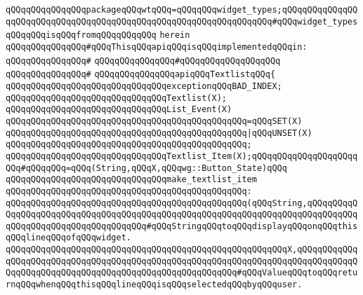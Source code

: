 \verb|qQQqqQQqqQQqqQQqpackageqQQqwtqQQq=qQQqqQQqwidget_types;qQQqqQQqqQQqqQQqqQQqqQQqqQQqqQQqqQQqqQQqqQQqqQQqqQQqqQQqqQQqqQQqqQQq#qQQqwidget_typesqQQqqQQqisqQQqfromqQQqqQQqqQQq|\newline
\verb|herein|\newline
\newline
\verb|qQQqqQQqqQQqqQQq#qQQqThisqQQqapiqQQqisqQQqimplementedqQQqin:|\newline
\verb|qQQqqQQqqQQqqQQq#|\newline
\verb|qQQqqQQqqQQqqQQq#qQQqqQQqqQQqqQQqqQQq|\newline
\verb|qQQqqQQqqQQqqQQq#|\newline
\verb|qQQqqQQqqQQqqQQqapiqQQqTextlistqQQq{|\newline
\newline
\verb|qQQqqQQqqQQqqQQqqQQqqQQqqQQqqQQqexceptionqQQqBAD_INDEX;|\newline
\newline
\verb|qQQqqQQqqQQqqQQqqQQqqQQqqQQqqQQqTextlist(X);|\newline
\newline
\verb|qQQqqQQqqQQqqQQqqQQqqQQqqQQqqQQqList_Event(X)|\newline
\verb|qQQqqQQqqQQqqQQqqQQqqQQqqQQqqQQqqQQqqQQqqQQqqQQq=qQQqSET(X)|\newline
\verb|qQQqqQQqqQQqqQQqqQQqqQQqqQQqqQQqqQQqqQQqqQQqqQQq|\verb#|qQQqUNSET(X)#\newline
\verb|qQQqqQQqqQQqqQQqqQQqqQQqqQQqqQQqqQQqqQQqqQQqqQQq;|\newline
\newline
\verb|qQQqqQQqqQQqqQQqqQQqqQQqqQQqqQQqTextlist_Item(X);qQQqqQQqqQQqqQQqqQQqqQQq#qQQqqQQq=qQQq(String,qQQqX,qQQqwg::Button_State)qQQq|\newline
\newline
\verb|qQQqqQQqqQQqqQQqqQQqqQQqqQQqqQQqmake_textlist_item|\newline
\verb|qQQqqQQqqQQqqQQqqQQqqQQqqQQqqQQqqQQqqQQqqQQqqQQq:|\newline
\verb|qQQqqQQqqQQqqQQqqQQqqQQqqQQqqQQqqQQqqQQqqQQqqQQq(qQQqString,qQQqqQQqqQQqqQQqqQQqqQQqqQQqqQQqqQQqqQQqqQQqqQQqqQQqqQQqqQQqqQQqqQQqqQQqqQQqqQQqqQQqqQQqqQQqqQQqqQQqqQQqqQQq#qQQqStringqQQqtoqQQqdisplayqQQqonqQQqthisqQQqlineqQQqofqQQqwidget.|\newline
\verb|qQQqqQQqqQQqqQQqqQQqqQQqqQQqqQQqqQQqqQQqqQQqqQQqqQQqqQQqX,qQQqqQQqqQQqqQQqqQQqqQQqqQQqqQQqqQQqqQQqqQQqqQQqqQQqqQQqqQQqqQQqqQQqqQQqqQQqqQQqqQQqqQQqqQQqqQQqqQQqqQQqqQQqqQQqqQQqqQQqqQQqqQQq#qQQqValueqQQqtoqQQqreturnqQQqwhenqQQqthisqQQqlineqQQqisqQQqselectedqQQqbyqQQquser.|\newline

